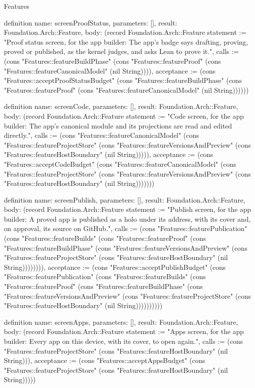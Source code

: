 \begin{lexlean}{Features}
\begin{semanticmodule}
definition{
  name: screenProofStatus,
  parameters: [],
  result: Foundation.Arch::Feature,
  body: (record Foundation.Arch::Feature {statement := "Proof status screen, for the app builder: The app's badge says drafting, proving, proved or published, as the kernel judges, and asks Lean to prove it.", calls := (cons "Features::featureBuildPhase" (cons "Features::featureProof" (cons "Features::featureCanonicalModel" (nil String)))), acceptance := (cons "Features::acceptProofStatusBudget" (cons "Features::featureBuildPhase" (cons "Features::featureProof" (cons "Features::featureCanonicalModel" (nil String)))))})
}

definition{
  name: screenCode,
  parameters: [],
  result: Foundation.Arch::Feature,
  body: (record Foundation.Arch::Feature {statement := "Code screen, for the app builder: The app's canonical module and its projections are read and edited directly.", calls := (cons "Features::featureCanonicalModel" (cons "Features::featureProjectStore" (cons "Features::featureVersionsAndPreview" (cons "Features::featureHostBoundary" (nil String))))), acceptance := (cons "Features::acceptCodeBudget" (cons "Features::featureCanonicalModel" (cons "Features::featureProjectStore" (cons "Features::featureVersionsAndPreview" (cons "Features::featureHostBoundary" (nil String))))))})
}

definition{
  name: screenPublish,
  parameters: [],
  result: Foundation.Arch::Feature,
  body: (record Foundation.Arch::Feature {statement := "Publish screen, for the app builder: A proved app is published as a holo under its address, with its cover and, on approval, its source on GitHub.", calls := (cons "Features::featurePublication" (cons "Features::featureBuilds" (cons "Features::featureProof" (cons "Features::featureBuildPhase" (cons "Features::featureVersionsAndPreview" (cons "Features::featureProjectStore" (cons "Features::featureHostBoundary" (nil String)))))))), acceptance := (cons "Features::acceptPublishBudget" (cons "Features::featurePublication" (cons "Features::featureBuilds" (cons "Features::featureProof" (cons "Features::featureBuildPhase" (cons "Features::featureVersionsAndPreview" (cons "Features::featureProjectStore" (cons "Features::featureHostBoundary" (nil String)))))))))})
}

definition{
  name: screenApps,
  parameters: [],
  result: Foundation.Arch::Feature,
  body: (record Foundation.Arch::Feature {statement := "Apps screen, for the app builder: Every app on this device, with its cover, to open again.", calls := (cons "Features::featureProjectStore" (cons "Features::featureHostBoundary" (nil String))), acceptance := (cons "Features::acceptAppsBudget" (cons "Features::featureProjectStore" (cons "Features::featureHostBoundary" (nil String))))})
}


\end{semanticmodule}
\end{lexlean}
